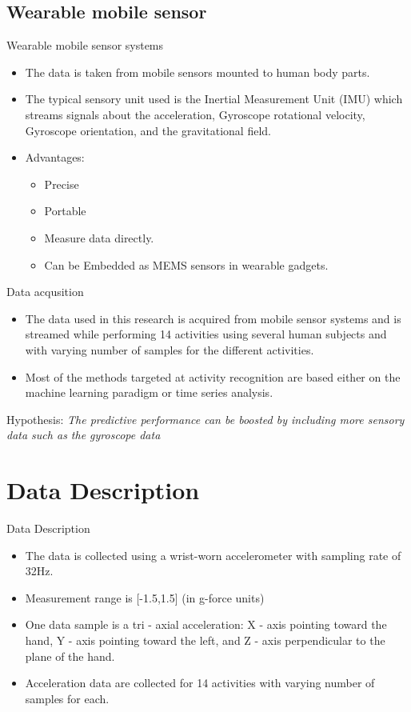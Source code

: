 \documentclass{beamer}
\begin{document}
\subsection{Wearable mobile sensor}
\begin{frame}{Wearable mobile sensor systems}
    \begin{itemize}
        \item The data is taken from mobile sensors mounted to human body parts.
        \item The typical sensory unit used is the Inertial Measurement Unit (IMU) which streams signals about the acceleration, Gyroscope rotational velocity, Gyroscope orientation, and the gravitational field.
        \item Advantages:
        \begin{itemize}
            \item Precise
            \item Portable
            \item Measure data directly.
            \item Can be Embedded as MEMS sensors in wearable gadgets.
        \end{itemize}
    \end{itemize}
\end{frame}
\begin{frame}{Data acqusition}
    \begin{itemize}
        \item The data used in this research is acquired from mobile sensor systems and is streamed while performing 14 activities using several human subjects and with varying number of samples for the different activities.
        \item Most of the methods targeted at activity recognition are based either on the machine learning paradigm or time series analysis.
    \end{itemize}
    \large
    Hypothesis:
    \emph{The predictive performance can be boosted by including more sensory data such as the gyroscope data}
\end{frame}
\section{Data Description}
\begin{frame}{Data Description}
    \begin{itemize}
        \item The data is collected using a wrist-worn accelerometer with sampling rate of 32Hz.
        \item Measurement range is [-1.5,1.5] (in g-force units)
        \item One data sample is a tri - axial acceleration: X - axis pointing toward the hand, Y - axis pointing toward the left, and Z - axis perpendicular to the plane of the hand.
        \item Acceleration data are collected for 14 activities with varying number of samples for each.
    \end{itemize}
\end{frame}
\end{document}
